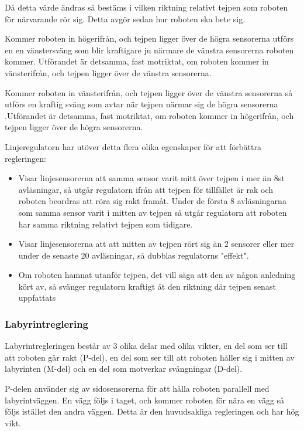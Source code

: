 Då detta värde ändras så bestäms i vilken riktning relativt tejpen som 
roboten för närvarande rör sig. Detta avgör sedan hur roboten ska bete sig.

Kommer roboten in högerifrån, och tejpen ligger över de högra sensorerna 
utförs en en vänstersväng som blir kraftigare ju närmare de vänstra 
sensorerna roboten kommer. Utförandet är detsamma, fast motriktat, om roboten 
kommer in vänsterifrån, och tejpen ligger över de vänstra sensorerna.

Kommer roboten in vänsterifrån, och tejpen ligger över de vänstra sensorerna 
så utförs en kraftig sväng som avtar när tejpen närmar sig de högra sensorerna
.Utförandet är detsamma, fast motriktat, om roboten kommer in högerifrån, och 
tejpen ligger över de högra sensorerna.


Linjeregulatorn har utöver detta flera olika egenskaper för att förbättra 
regleringen:
\begin{itemize}
\item Visar linjesensorerna att samma sensor varit mitt över tejpen i mer än 8st 
avläsningar, så utgår regulatorn ifrån att tejpen för tillfället är rak och roboten 
beordras att röra sig rakt framåt. Under de första 8 avläsningarna som samma 
sensor varit i mitten av tejpen så utgår regulatorn att roboten har samma riktning 
relativt tejpen som tidigare.
\item Visar linjesensorerna att att mitten av tejpen rört sig än 2 sensorer eller mer
 under de senaste 20 avläsningar, så dubblas regulatorns "effekt".
\item Om roboten hamnat utanför tejpen, det vill säga att den av någon anledning 
kört av, så svänger regulatorn kraftigt åt den riktning där tejpen senast uppfattats
\end{itemize}



\subsubsection{Labyrintreglering}
\label{sec:labyrintreglering}
Labyrintregleringen består av 3 olika delar med olika vikter,
en del som ser till att roboten går rakt (P-del), en del som ser till att
roboten håller sig i mitten av labyrinten (M-del) och en del som motverkar
svängningar (D-del).


P-delen använder sig av sidosensorerna för att hålla roboten parallell med
labyrintväggen. En vägg följs i taget, och kommer roboten för nära en vägg så
följs istället den andra väggen. Detta är den huvudsakliga regleringen och har
hög vikt.



